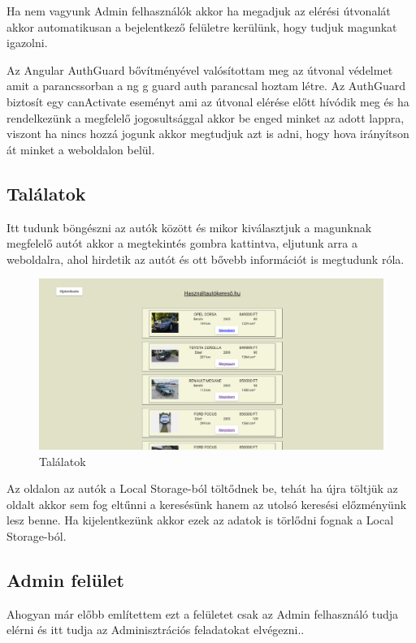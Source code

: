 Ha nem vagyunk Admin felhasználók akkor ha megadjuk az elérési útvonalát akkor automatikusan a bejelentkező felületre kerülünk, hogy tudjuk magunkat igazolni.

Az Angular AuthGuard bővítményével valósítottam meg az útvonal védelmet amit a parancssorban a ng g guard auth parancsal hoztam létre.
Az AuthGuard biztosít egy canActivate eseményt ami az útvonal elérése előtt hívódik meg és ha rendelkezünk a megfelelő jogosultsággal akkor be enged minket az adott lappra, viszont ha nincs hozzá jogunk akkor megtudjuk azt is adni, hogy hova irányítson át minket a weboldalon belül.

\subsection{Találatok}

Itt tudunk böngészni az autók között és mikor kiválasztjuk a magunknak megfelelő autót akkor a megtekintés gombra kattintva, eljutunk arra a weboldalra, ahol hirdetik az autót és ott bővebb információt is megtudunk róla.

\begin{figure}[h]
\centering
\includegraphics[scale=0.9]{images/Talalatok_FE.png}
\caption{Találatok}
\label{fig:Találatok}
\end{figure}

Az oldalon az autók a Local Storage-ból töltődnek be, tehát ha újra töltjük az oldalt akkor sem fog eltűnni a keresésünk hanem az utolsó keresési előzményünk lesz benne. Ha kijelentkezünk akkor ezek az adatok is törlődni fognak a Local Storage-ból.
\newpage

\subsection{Admin felület}

Ahogyan már előbb említettem ezt a felületet csak az Admin felhasználó tudja elérni és itt tudja az Adminisztrációs feladatokat elvégezni..


